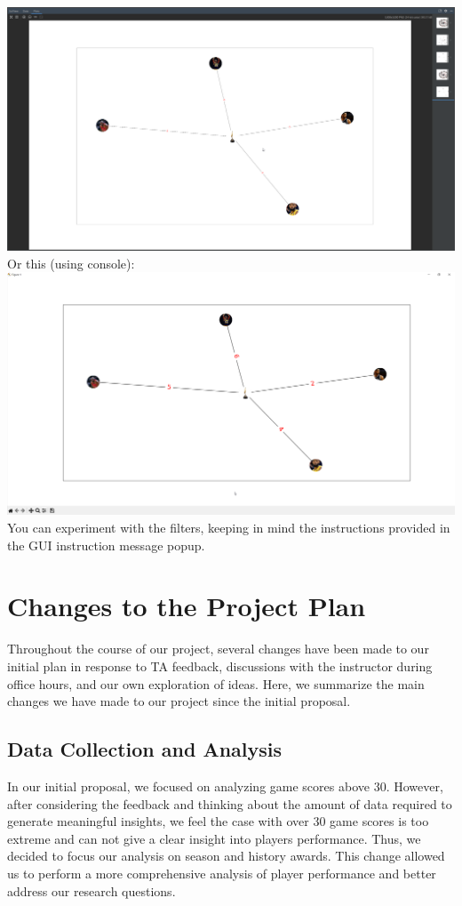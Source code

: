 \documentclass[fontsize=11pt]{article}
\begin{document}
\includegraphics[width=18cm]{pycharmss.png}
Or this (using console):\\
\includegraphics[width=18cm]{consoless.png}
You can experiment with the filters, keeping in mind the instructions provided in the GUI instruction message popup.

\section{Changes to the Project Plan}

Throughout the course of our project, several changes have been made to our initial plan in response to TA feedback, discussions with the instructor during office hours, and our own exploration of ideas. Here, we summarize the main changes we have made to our project since the initial proposal.

\subsection{Data Collection and Analysis}
In our initial proposal, we focused on analyzing game scores above 30. However, after considering the feedback and thinking about the amount of data required to generate meaningful insights, we feel the case with over 30 game scores is too extreme and can not give a clear insight into players performance. Thus, we decided to focus our analysis on season and history awards. This change allowed us to perform a more comprehensive analysis of player performance and better address our research questions.
\end{document}

